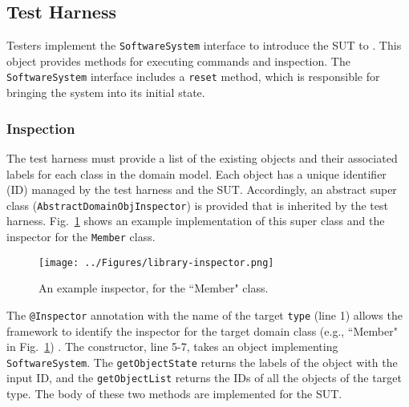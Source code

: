 \subsection{Test Harness}
\label{sec:create-test model-test-harness}

Testers implement the \texttt{SoftwareSystem} interface to introduce the SUT to \this.
This object provides methods for executing commands and inspection. The \texttt{SoftwareSystem} interface includes a \texttt{reset} method, which is responsible for bringing the system into its initial state. %



\subsubsection{Inspection}
\label{sec:test-harness-inspection}
The test harness must provide a list of the existing objects and their associated labels for each class in the domain model. Each object has a unique identifier (ID) managed by the test harness and the SUT. Accordingly, an abstract super class (\texttt{AbstractDomainObjInspector})  is provided that is inherited by the test harness. Fig.~\ref{fig:library-inspector} shows an example implementation of this super class and the inspector for the \texttt{Member} class.

\begin{figure}[h]
\centering
\texttt{[image: ../Figures/library-inspector.png]}
\caption{An example inspector, for the ``Member" class.}
\label{fig:library-inspector}
\end{figure}

 
The \texttt{@Inspector} annotation with the name of the target \texttt{type} (line 1) allows the framework to identify the inspector for the target domain class (e.g., ``Member" in Fig.~\ref{fig:library-inspector}) . The constructor, line 5-7, takes an object implementing \texttt{SoftwareSystem}. The \texttt{getObjectState} returns the labels of the object with the input ID, and the \texttt{getObjectList} returns the IDs of all the objects of the target type. The body of these two methods are implemented for the SUT.

